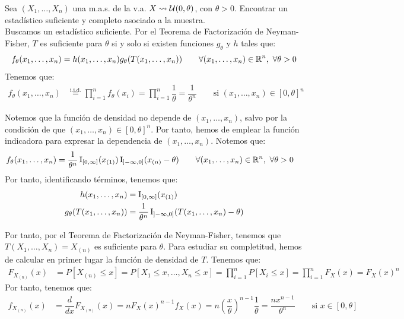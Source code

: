\begin{ejemplo}\label{ejemplo:suficiencia-completitud-Uniforme}
    Sea $(X_1, \ldots, X_n)$ una m.a.s. de la v.a. $X \rightsquigarrow 
    \mathcal{U}(0, \theta)$, con $\theta > 0$. Encontrar un estadístico suficiente y completo asociado a la muestra.\\
    
    
    Buscamos un estadístico suficiente. Por el Teorema de Factorización de Neyman-Fisher, $T$ es suficiente para $\theta$ si y solo si existen funciones $g_\theta$ y $h$ tales que:
    \begin{equation*}
        f_\theta(x_1, \ldots, x_n) = h(x_1, \ldots, x_n) g_\theta(T(x_1, \ldots, x_n)) \qquad \forall (x_1, \ldots, x_n)\in\mathbb{R}^n,\ \forall \theta > 0
    \end{equation*}
    Tenemos que:
    \begin{align*}
        f_\theta(x_1, \ldots, x_n) &\stackrel{\text{i.i.d.}}{=} \prod_{i=1}^n f_\theta(x_i) = \prod_{i=1}^n \dfrac{1}{\theta} = \dfrac{1}{\theta^n}\qquad \text{si } (x_1, \ldots, x_n)\in [0, \theta]^n
    \end{align*}

    Notemos que la función de densidad no depende de $(x_1, \ldots, x_n)$, salvo por la condición de que $(x_1, \ldots, x_n)\in [0, \theta]^n$. Por tanto, hemos de emplear la función indicadora para expresar la dependencia de $(x_1, \ldots, x_n)$. Notemos que:
    \begin{align*}
        f_\theta(x_1, \ldots, x_n) & = \dfrac{1}{\theta^n} \ind_{[0,\infty]}(x_{(1)}) \ind_{\left]-\infty, 0\right]}(x_{(n)}-\theta)\qquad \forall (x_1, \ldots, x_n)\in\bb{R}^n,\ \forall \theta > 0
    \end{align*}
    Por tanto, identificando términos, tenemos que:
    \begin{align*}
        h(x_1, \ldots, x_n) &= \operatorname{I}_{[0,\infty]}(x_{(1)}) \\
        g_\theta(T(x_1, \ldots, x_n)) &= \dfrac{1}{\theta^n} \operatorname{I}_{\left]-\infty, 0\right]}(T(x_1, \ldots, x_n)-\theta)
    \end{align*} 

    Por tanto, por el Teorema de Factorización de Neyman-Fisher, tenemos que $T(X_1, \ldots, X_n) = X_{(n)}$ es suficiente para $\theta$. Para estudiar su completitud, hemos de calcular en primer lugar la función de densidad de $T$. Tenemos que:
    \begin{align*}
        F_{X_{(n)}}(x) &= P[X_{(n)} \leq x] = P[X_1\leq x, \ldots, X_n\leq x] = \prod_{i=1}^n P[X_i\leq x] = \prod_{i=1}^n F_X(x) = F_X(x)^n
    \end{align*}
    Por tanto, tenemos que:
    \begin{align*}
        f_{X_{(n)}}(x) &= \dfrac{d}{dx} F_{X_{(n)}}(x) = n F_X(x)^{n-1} f_X(x) = n \left(\dfrac{x}{\theta}\right)^{n-1} \dfrac{1}{\theta} = \dfrac{n x^{n-1}}{\theta^n} \qquad \text{si } x\in [0, \theta]
    \end{align*}


\end{ejemplo}
